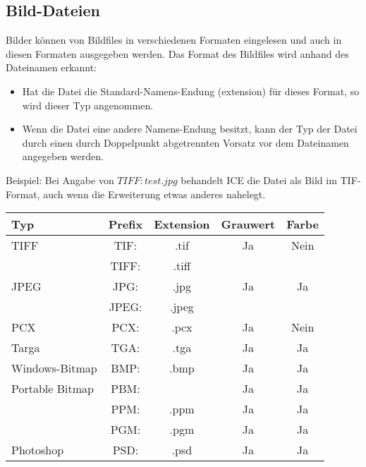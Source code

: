 
\subsection{Bild-Dateien}

Bilder können von Bildfiles in verschiedenen Formaten eingelesen und 
auch in diesen Formaten ausgegeben werden. Das Format
des Bildfiles wird anhand des Dateinamen erkannt:
\begin{itemize}
\item Hat die Datei die Standard-Namens-Endung (extension) für dieses 
Format, so wird dieser Typ angenommen.
\item Wenn die Datei eine andere Namens-Endung besitzt, kann der Typ
der Datei durch einen durch Doppelpunkt abgetrennten Vorsatz vor
dem Dateinamen angegeben werden.\\
\end{itemize}
Beispiel: Bei Angabe von $TIFF:test.jpg$ behandelt ICE die Datei als
Bild im TIF-Format, auch wenn die Erweiterung etwas anderes nahelegt.

\begin{tabular}{|l|c|c|c|c|} \hline
 Typ & Prefix & Extension & Grauwert & Farbe \\ \hline \hline
TIFF & TIF: & .tif & Ja & Nein \\ 
 & TIFF: & .tiff & & \\ \hline
JPEG & JPG: & .jpg & Ja & Ja \\ 
 & JPEG: & .jpeg & & \\ \hline
PCX & PCX: & .pcx & Ja & Nein \\ \hline
Targa & TGA: & .tga & Ja & Ja \\ \hline
Windows-Bitmap & BMP: & .bmp & Ja & Ja \\ \hline
Portable Bitmap & PBM: &  & Ja & Ja \\ \hline
 & PPM: & .ppm & Ja & Ja \\ \hline
 & PGM: & .pgm & Ja & Ja \\ \hline
Photoshop & PSD: & .psd & Ja & Ja \\ \hline
\end{tabular}

